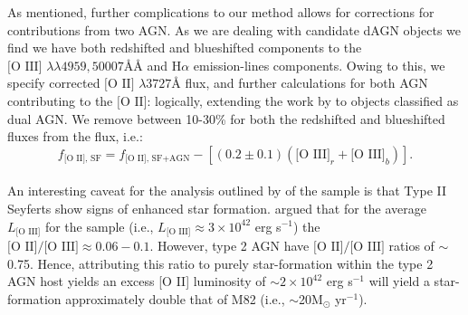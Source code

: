 As mentioned, further complications to our method allows for corrections for contributions from two AGN. As we are dealing with candidate dAGN objects we find we have both redshifted and blueshifted components to the $\text{[O III] }\lambda\lambda4959,50007ÅÅ$ and $\text{H}\alpha$ emission-lines components. Owing to this, we specify corrected $\text{[O II] }\lambda3727Å$ flux, and further calculations for both AGN contributing to the $\text{[O II]}$: logically, extending the work by \cite{2006ApJ...642..702K} to objects classified as dual AGN. We remove between 10-30\% for both the redshifted and blueshifted \text{[O III]} fluxes from the \text{[O II]} flux, i.e.:
\\
\begin{equation}
\label{eq:KimCorrection}
f_{\text{[O II], SF}}=f_{\text{[O II], SF+AGN}}-\left[(0.2\pm{0.1})(\text{[O III]}_r+\text{[O III]}_b)\right].
\end{equation}
\\
An interesting caveat for the analysis outlined by \cite{2006ApJ...642..702K} of the \cite{Zakamska2003} sample is that Type II Seyferts show signs of enhanced star formation. \cite{2006ApJ...642..702K} argued that for the average $L_{\text{[O III]}}$ for the \cite{Zakamska2003} sample (i.e., $L_{\text{[O III]}}\approx{3\times{10^{42}}}$ erg s$^{-1}$) the $\text{[O II]/[O III]}\approx{0.06-0.1}$. However, type 2 AGN have $\text{[O II]/[O III]}$ ratios of $\sim$0.75. Hence, attributing this ratio to purely star-formation within the type 2 AGN host yields an excess [O II] luminosity of $\sim{2\times{10^{42}}}$ erg s$^{-1}$ will yield a star-formation approximately double that of M82 (i.e., $\sim$20M$_{\odot}$ yr$^{-1}$).